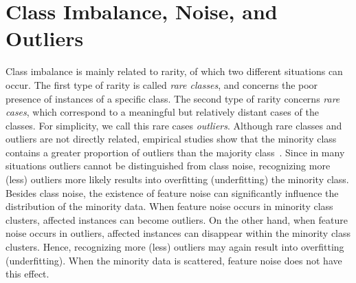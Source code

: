 \section{Class Imbalance, Noise, and Outliers}\label{causestheproblem}
Class imbalance is mainly related to rarity, of which two different situations can occur. The first type of rarity is called \textit{rare classes}, and concerns the poor presence of instances of a specific class. The second type of rarity concerns \textit{rare cases}, which correspond to a meaningful but relatively distant cases of the classes. For simplicity, we call this rare cases \textit{outliers}. Although rare classes and outliers are not directly related, empirical studies show that the minority class contains a greater proportion of outliers than the majority class~\cite{Weiss03learningwhen}. Since in many situations outliers cannot be distinguished from class noise, recognizing more (less) outliers more likely results into overfitting (underfitting) the minority class. Besides class noise, the existence of feature noise can significantly influence the distribution of the minority data. When feature noise occurs in minority class clusters, affected instances can become outliers. On the other hand, when feature noise occurs in outliers, affected instances can disappear within the minority class clusters. Hence, recognizing more (less) outliers may again result into overfitting (underfitting). When the minority data is scattered, feature noise does not have this effect.~\cite{Japkowicz02classimbalance}~\cite{Prati04classimbalances}~\cite{miningwith04}


